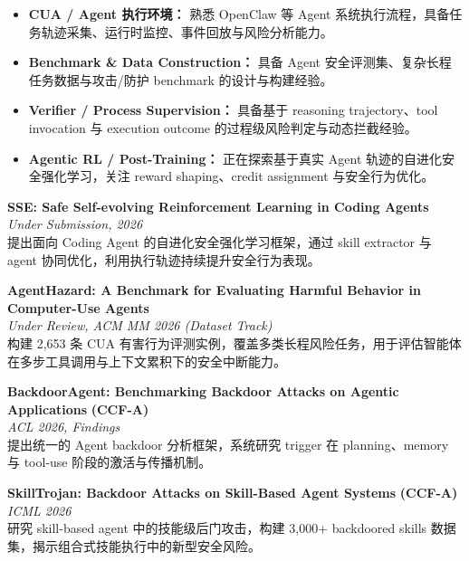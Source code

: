 \begin{itemize}[leftmargin=1.5em]
  \item \textbf{CUA / Agent 执行环境：} 熟悉 OpenClaw 等 Agent 系统执行流程，具备任务轨迹采集、运行时监控、事件回放与风险分析能力。
  \item \textbf{Benchmark \& Data Construction：} 具备 Agent 安全评测集、复杂长程任务数据与攻击/防护 benchmark 的设计与构建经验。
  \item \textbf{Verifier / Process Supervision：} 具备基于 reasoning trajectory、tool invocation 与 execution outcome 的过程级风险判定与动态拦截经验。
  \item \textbf{Agentic RL / Post-Training：} 正在探索基于真实 Agent 轨迹的自进化安全强化学习，关注 reward shaping、credit assignment 与安全行为优化。
\end{itemize}




\textbf{SSE: Safe Self-evolving Reinforcement Learning in Coding Agents} \\
\textit{Under Submission, 2026} \\
提出面向 Coding Agent 的自进化安全强化学习框架，通过 skill extractor 与 agent 协同优化，利用执行轨迹持续提升安全行为表现。

\vspace{0.3em}
\textbf{AgentHazard: A Benchmark for Evaluating Harmful Behavior in Computer-Use Agents} \\
\textit{Under Review, ACM MM 2026 (Dataset Track)} \\
构建 2,653 条 CUA 有害行为评测实例，覆盖多类长程风险任务，用于评估智能体在多步工具调用与上下文累积下的安全中断能力。

\vspace{0.3em}
\textbf{BackdoorAgent: Benchmarking Backdoor Attacks on Agentic Applications} \hfill \textbf{(CCF-A)} \\
\textit{ACL 2026, Findings} \\
提出统一的 Agent backdoor 分析框架，系统研究 trigger 在 planning、memory 与 tool-use 阶段的激活与传播机制。

\vspace{0.3em}
\textbf{SkillTrojan: Backdoor Attacks on Skill-Based Agent Systems} \hfill \textbf{(CCF-A)} \\
\textit{ICML 2026} \\
研究 skill-based agent 中的技能级后门攻击，构建 3,000+ backdoored skills 数据集，揭示组合式技能执行中的新型安全风险。


